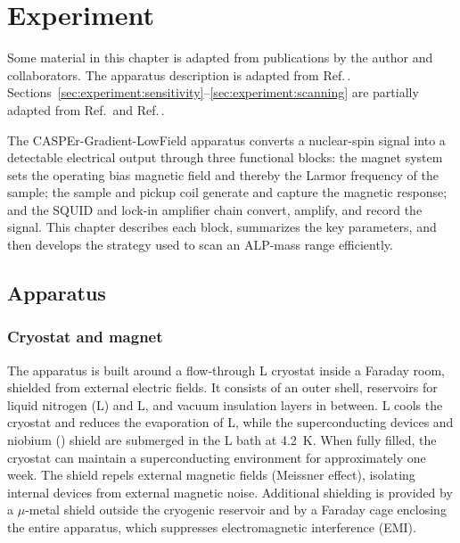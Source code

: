 \chapter{Experiment}\label{chap:experiment}
\begin{jointwork}
    Some material in this chapter is adapted from publications by the author and collaborators. 
    The apparatus description is adapted from Ref.\,\cite{Walter2025_CASPErLFthermal}.
    Sections~\ref{sec:experiment:sensitivity}--\ref{sec:experiment:scanning} are partially adapted from Ref.\,\cite{Yuzhe2023_FrequencyScanning} and Ref.\,\cite{YGK2026_CavityLumpedSpin}.
\end{jointwork}

The CASPEr-Gradient-LowField apparatus converts a nuclear-spin signal into a detectable electrical output through three functional blocks: the magnet system sets the operating bias magnetic field and thereby the Larmor frequency of the sample; the sample and pickup coil generate and capture the magnetic response; and the SQUID and lock-in amplifier chain convert, amplify, and record the signal.
This chapter describes each block, summarizes the key parameters, and then develops the strategy used to scan an ALP-mass range efficiently.

\section{Apparatus}\label{sec:apparatus}
\subsection{Cryostat and magnet}\label{sec:apparatus:magnet}

The apparatus is built around a flow-through L cryostat inside a Faraday room, shielded from external electric fields.
It consists of an outer shell, reservoirs for liquid nitrogen (L) and L, and vacuum insulation layers in between.
L cools the cryostat and reduces the evaporation of L, while the superconducting devices and niobium () shield are submerged in the L bath at \SI{4.2}{\kelvin}.
When fully filled, the cryostat can maintain a superconducting environment for approximately one week.
The  shield repels external magnetic fields (Meissner effect), isolating internal devices from external magnetic noise.
Additional shielding is provided by a $\mu$-metal shield outside the cryogenic reservoir and by a Faraday cage enclosing the entire apparatus, which suppresses electromagnetic interference (EMI).

